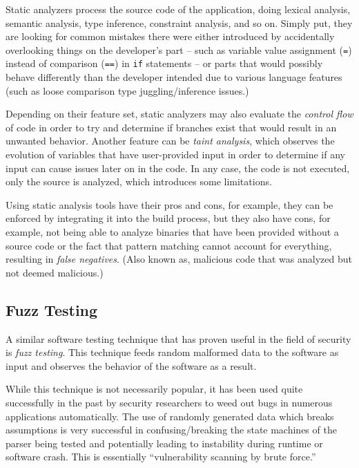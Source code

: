 \documentclass[a4paper,12pt]{article}
\begin{document}
	Static analyzers process the source code of the application, doing lexical analysis, semantic analysis, type inference, constraint analysis, and so on. Simply put, they are looking for common mistakes there were either introduced by accidentally overlooking things on the developer's part -- such as variable value assignment (\texttt{=}) instead of comparison (\texttt{==}) in \texttt{if} statements -- or parts that would possibly behave differently than the developer intended due to various language features (such as loose comparison type juggling/inference issues.)
	
	Depending on their feature set, static analyzers may also evaluate the \textit{control flow} of code in order to try and determine if branches exist that would result in an unwanted behavior. Another feature can be \textit{taint analysis}, which observes the evolution of variables that have user-provided input in order to determine if any input can cause issues later on in the code. In any case, the code is not executed, only the source is analyzed, which introduces some limitations.
	
	Using static analysis tools have their pros and cons, for example, they can be enforced by integrating it into the build process, but they also have cons, for example, not being able to analyze binaries that have been provided without a source code or the fact that pattern matching cannot account for everything, resulting in \textit{false negatives}. (Also known as, malicious code that was analyzed but not deemed malicious.)
	
\subsection{Fuzz Testing}
 
	
	A similar software testing technique that has proven useful in the field of security is \textit{fuzz testing}. This technique feeds random malformed data to the software as input and observes the behavior of the software as a result.
	
	While this technique is not necessarily popular, it has been used quite successfully in the past by security researchers to weed out bugs in numerous applications automatically.\cite{mzalewski15} The use of randomly generated data which breaks assumptions is very successful in confusing/breaking the state machines of the parser being tested and potentially leading to instability during runtime or software crash. This is essentially ``vulnerability scanning by brute force.''
	
\end{document}
